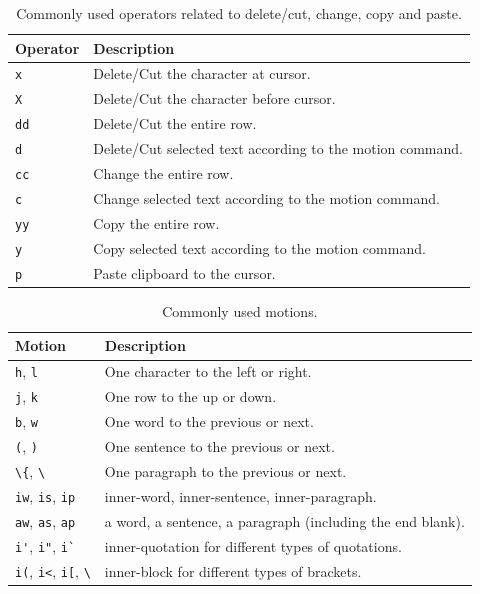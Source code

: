 \begin{table}
  \centering \caption{Commonly used operators related to delete/cut, change, copy and paste.}\label{ch3tab:deletecut}
  \begin{tabularx}{\textwidth}{lX}
    \hline
    Operator & Description \\ \hline
    \verb|x| & Delete/Cut the character at cursor. \\ \hdashline
    \verb|X| & Delete/Cut the character before cursor. \\ \hdashline
    \verb|dd| & Delete/Cut the entire row. \\ \hdashline
    \verb|d| & Delete/Cut selected text according to the motion command. \\ \hdashline
    \verb|cc| & Change the entire row. \\ \hdashline
    \verb|c| & Change selected text according to the motion command. \\ \hdashline
    \verb|yy| & Copy the entire row. \\ \hdashline
    \verb|y| & Copy selected text according to the motion command. \\ \hdashline
    \verb|p| & Paste clipboard to the cursor. \\
    \hline
  \end{tabularx}
\end{table}

\begin{table}
  \centering \caption{Commonly used motions.}\label{ch3tab:motion}
  \begin{tabularx}{\textwidth}{lX}
    \hline
    Motion & Description \\ \hline
    \verb|h|, \verb|l| & One character to the left or right. \\ \hdashline
    \verb|j|, \verb|k| & One row to the up or down. \\ \hdashline
    \verb|b|, \verb|w| & One word to the previous or next. \\ \hdashline
    \verb|(|, \verb|)| & One sentence to the previous or next. \\ \hdashline
    \lstinline{\{}, \lstinline{\}} & One paragraph to the previous or next. \\ \hdashline
    \verb|iw|, \verb|is|, \verb|ip| & inner-word, inner-sentence, inner-paragraph. \\ \hdashline
    \verb|aw|, \verb|as|, \verb|ap| & a word, a sentence, a paragraph (including the end blank). \\ \hdashline
    \verb|i'|, \verb|i"|, \verb|i`| & inner-quotation for different types of quotations. \\ \hdashline
    \verb|i(|, \verb|i<|, \verb|i[|, \lstinline{\}} & inner-block for different types of brackets. \\
    \hline
  \end{tabularx}
\end{table}

